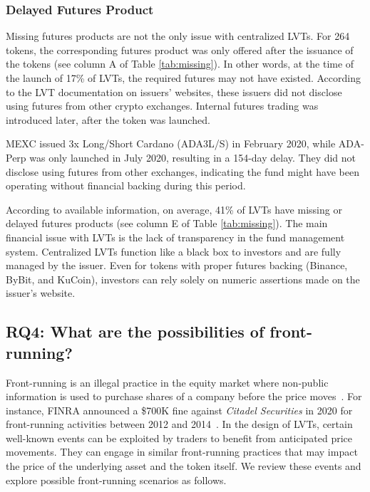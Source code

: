 \subsubsection{Delayed Futures Product}
Missing futures products are not the only issue with centralized LVTs. For 264 tokens, the corresponding futures product was only offered after the issuance of the tokens (see column A of Table \ref{tab:missing}). In other words, at the time of the launch of 17\% of LVTs, the required futures may not have existed. According to the LVT documentation on issuers' websites, these issuers did not disclose using futures from other crypto exchanges. Internal futures trading was introduced later, after the token was launched.

\begin{example}
	MEXC issued 3x Long/Short Cardano (ADA3L/S) in February 2020, while ADA-Perp was only launched in July 2020, resulting in a 154-day delay. They did not disclose using futures from other exchanges, indicating the fund might have been operating without financial backing during this period.
\end{example}

According to available information, on average, 41\% of LVTs have missing or delayed futures products (see column E of Table \ref{tab:missing}). The main financial issue with LVTs is the lack of transparency in the fund management system. Centralized LVTs function like a black box to investors and are fully managed by the issuer. Even for tokens with proper futures backing (\eg Binance, ByBit, and KuCoin), investors can rely solely on numeric assertions made on the issuer's website.

\subsection*{RQ4: What are the possibilities of front-running?}\label{subsec:frontrunning}
Front-running is an illegal practice in the equity market where non-public information is used to purchase shares of a company before the price moves~\cite{eskandari2019sok,zhou2021high,baum2022sok}. For instance, FINRA announced a \$700K fine against \textsl{Citadel Securities} in 2020 for front-running activities between 2012 and 2014~\cite{Investo_FrontRunning}. In the design of LVTs, certain well-known events can be exploited by traders to benefit from anticipated price movements. They can engage in similar front-running practices that may impact the price of the underlying asset and the token itself. We review these events and explore possible front-running scenarios as follows.

